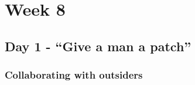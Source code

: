 \cleardoublepage
\chapter{Week 8}

\section{Day 1 - ``Give a man a patch''}
\subsection{Collaborating with outsiders}
